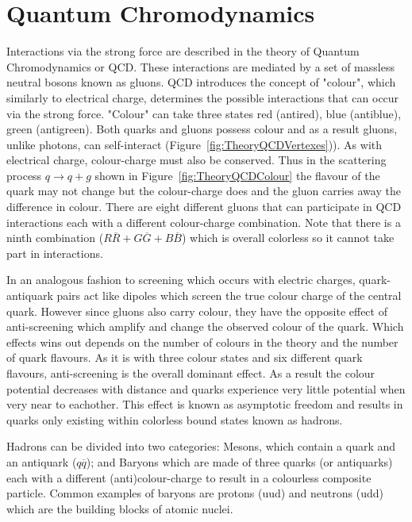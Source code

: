 \section{Quantum Chromodynamics}

Interactions via the strong force are described in the theory of Quantum Chromodynamics or QCD. These interactions are mediated by a set of massless neutral bosons known as gluons. QCD introduces the concept of "colour", which similarly to electrical charge, determines the possible interactions that can occur via the strong force. "Colour" can take three states red (antired), blue (antiblue), green (antigreen). Both quarks and gluons possess colour and as a result gluons, unlike photons, can self-interact (Figure~\ref{fig:TheoryQCDVertexes})). As with electrical charge, colour-charge must also be conserved. Thus in the scattering process $q\rightarrow q+g$ shown in Figure~\ref{fig:TheoryQCDColour} the flavour of the quark may not change but the colour-charge does and the gluon carries away the difference in colour. There are eight different gluons that can participate in QCD interactions each with a different colour-charge combination. Note that there is a ninth combination ($R\overline{R} + G\overline{G}+B\overline{B}$) which is overall colorless so it cannot take part in interactions.

In an analogous fashion to screening which occurs with electric charges, quark-antiquark pairs act like dipoles which screen the true colour charge of the central quark. However since gluons also carry colour, they have the opposite effect of anti-screening which amplify and change the observed colour of the quark. Which effects wins out depends on the number of colours in the theory and the number of quark flavours. As it is with three colour states and six different quark flavours, anti-screening is the overall dominant effect. As a result the colour potential decreases with distance and quarks experience very little potential when very near to eachother. This effect is known as asymptotic freedom and results in quarks only existing within colorless bound states known as hadrons.

Hadrons can be divided into two categories: Mesons, which contain a quark and an antiquark ($q\overline{q}$); and Baryons which are made of three quarks (or antiquarks) each with a different (anti)colour-charge to result in a colourless composite particle. Common examples of baryons are protons (uud) and neutrons (udd) which are the building blocks of atomic nuclei.
  
